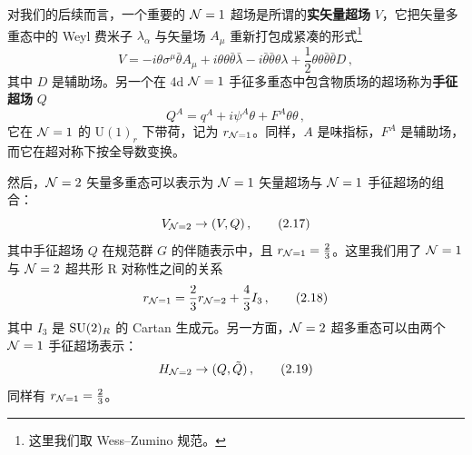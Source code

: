 
对我们的后续而言，一个重要的 $\mathcal{N}=1$ 超场是所谓的\textbf{实矢量超场} $V$，它把矢量多重态中的 Weyl 费米子 $\lambda_\alpha$ 与矢量场 $A_\mu$ 重新打包成紧凑的形式\footnote{这里我们取 Wess--Zumino 规范。}
\begin{equation}
  V=-i\theta\sigma^\mu\bar\theta A_\mu+i\theta\theta\bar\theta\bar\lambda-i\bar\theta\bar\theta\theta\lambda+\frac12\theta\theta\bar\theta\bar\theta D\,,
  \tag{2.15}
\end{equation}
其中 $D$ 是辅助场。另一个在 4d $\mathcal{N}=1$ 手征多重态中包含物质场的超场称为\textbf{手征超场} $Q$
\begin{equation}
  Q^A=q^A+i\psi^A\theta+F^A\theta\theta\,,
  \tag{2.16}
\end{equation}
它在 $\mathcal{N}=1$ 的 $\mathrm{U}(1)_r$ 下带荷，记为 $r_{\mathcal{N}=1}$。同样，$A$ 是味指标，$F^A$ 是辅助场，而它在超对称下按全导数变换。

然后，$\mathcal{N}=2$ 矢量多重态可以表示为 $\mathcal{N}=1$ 矢量超场与 $\mathcal{N}=1$ 手征超场的组合：
\begin{equation}
  V_{\mathcal{N}=2}\to(V,Q)\,,
  \tag{2.17}
\end{equation}
其中手征超场 $Q$ 在规范群 $G$ 的伴随表示中，且 $r_{\mathcal{N}=1}=\frac23$。这里我们用了 $\mathcal{N}=1$ 与 $\mathcal{N}=2$ 超共形 R 对称性之间的关系
\begin{equation}
  r_{\mathcal{N}=1}=\frac23 r_{\mathcal{N}=2}+\frac43 I_3\,,
  \tag{2.18}
\end{equation}
其中 $I_3$ 是 $\mathrm{SU}(2)_R$ 的 Cartan 生成元。另一方面，$\mathcal{N}=2$ 超多重态可以由两个 $\mathcal{N}=1$ 手征超场表示：
\begin{equation}
  H_{\mathcal{N}=2}\to(Q,\tilde Q)\,,
  \tag{2.19}
\end{equation}
同样有 $r_{\mathcal{N}=1}=\frac23$。

